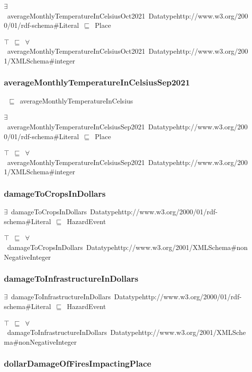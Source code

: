 \documentclass{article}
\begin{document}
\ensuremath{\exists}~averageMonthlyTemperatureInCelsiusOct2021~Datatypehttp://www.w3.org/2000/01/rdf-schema#Literal~\ensuremath{\sqsubseteq}~Place

\ensuremath{\top}~\ensuremath{\sqsubseteq}~\ensuremath{\forall}~averageMonthlyTemperatureInCelsiusOct2021~Datatypehttp://www.w3.org/2001/XMLSchema#integer

\subsubsection*{averageMonthlyTemperatureInCelsiusSep2021}

~\ensuremath{\sqsubseteq}~averageMonthlyTemperatureInCelsius

\ensuremath{\exists}~averageMonthlyTemperatureInCelsiusSep2021~Datatypehttp://www.w3.org/2000/01/rdf-schema#Literal~\ensuremath{\sqsubseteq}~Place

\ensuremath{\top}~\ensuremath{\sqsubseteq}~\ensuremath{\forall}~averageMonthlyTemperatureInCelsiusSep2021~Datatypehttp://www.w3.org/2001/XMLSchema#integer

\subsubsection*{damageToCropsInDollars}

\ensuremath{\exists}~damageToCropsInDollars~Datatypehttp://www.w3.org/2000/01/rdf-schema#Literal~\ensuremath{\sqsubseteq}~HazardEvent

\ensuremath{\top}~\ensuremath{\sqsubseteq}~\ensuremath{\forall}~damageToCropsInDollars~Datatypehttp://www.w3.org/2001/XMLSchema#nonNegativeInteger

\subsubsection*{damageToInfrastructureInDollars}

\ensuremath{\exists}~damageToInfrastructureInDollars~Datatypehttp://www.w3.org/2000/01/rdf-schema#Literal~\ensuremath{\sqsubseteq}~HazardEvent

\ensuremath{\top}~\ensuremath{\sqsubseteq}~\ensuremath{\forall}~damageToInfrastructureInDollars~Datatypehttp://www.w3.org/2001/XMLSchema#nonNegativeInteger

\subsubsection*{dollarDamageOfFiresImpactingPlace}
\end{document}
